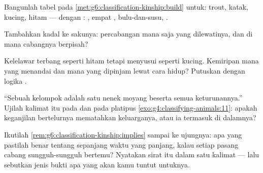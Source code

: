 \begin{exercise}[$\star\star$]\label{exo:g6:classification-kinship:8}
Bangunlah tabel  pada
\cref{met:g6:classification-kinship:build} untuk:  trout, katak,
kucing,  hitam --- dengan : , empat
, bulu-dan-susu, .
\end{exercise}

\begin{exercise}[$\star\star$]\label{exo:g6:classification-kinship:9}
Tambahkan kadal ke  sakunya: percabangan mana saja yang
dilewatinya, dan di mana cabangnya berpisah?
\end{exercise}

\begin{exercise}[$\star\star$]\label{exo:g6:classification-kinship:10}
Kelelawar terbang seperti  hitam tetapi menyusui seperti kucing.
Kemiripan mana yang menandai  dan mana yang dipinjam lewat
cara hidup? Putuskan dengan logika .
\end{exercise}

\begin{exercise}[$\star\star$]\label{exo:g6:classification-kinship:11}
``Sebuah kelompok adalah satu nenek moyang beserta semua
keturunannya.'' Ujilah kalimat itu pada  dan pada platipus
\cref{exo:g4:classifying-animals:11}: apakah keganjilan bertelurnya
mematahkan keluarganya, atau ia termasuk di dalamnya?
\end{exercise}

\begin{exercise}[$\star\star\star$]\label{exo:g6:classification-kinship:12}
Ikutilah \cref{rem:g6:classification-kinship:implies} sampai ke
ujungnya: apa yang pastilah benar tentang  sepanjang waktu yang
panjang, kalau setiap pasang cabang sungguh-sungguh bertemu? Nyatakan
sirat itu dalam satu kalimat --- lalu sebutkan jenis bukti apa yang
akan kamu tuntut untuknya.
\end{exercise}

